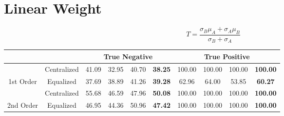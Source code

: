 \documentclass[10pt,a4paper]{article}
\begin{document}
	
	\section{Linear Weight}
		$$T = \frac{\sigma_B \mu_A + \sigma_A \mu_B}{\sigma_B + \sigma_A}$$
		
		\begin{table}[!h]
			\centering
			\begin{tabular}{|c|c|c|c|c|c|c|c|c|c|}
				\hline
				&             & \multicolumn{4}{c|}{True Negative}                            & \multicolumn{4}{c|}{True Positive}                                \\ \hline
				& Centralized & 41.09 & 32.95 & 40.70 & {\color[HTML]{FE0000} \textbf{38.25}} & 100.00 & 100.00 & 100.00 & {\color[HTML]{FE0000} \textbf{100.00}} \\ \cline{2-10} 
				\multirow{-2}{*}{1st Order} & Equalized   & 37.69 & 38.89 & 41.26 & {\color[HTML]{FE0000} \textbf{39.28}} & 62.96  & 64.00  & 53.85  & {\color[HTML]{FE0000} \textbf{60.27}}  \\ \hline
				& Centralized & 55.68 & 46.59 & 47.96 & {\color[HTML]{FE0000} \textbf{50.08}} & 100.00 & 100.00 & 100.00 & {\color[HTML]{FE0000} \textbf{100.00}} \\ \cline{2-10} 
				\multirow{-2}{*}{2nd Order} & Equalized   & 46.95 & 44.36 & 50.96 & {\color[HTML]{FE0000} \textbf{47.42}} & 100.00 & 100.00 & 100.00 & {\color[HTML]{FE0000} \textbf{100.00}} \\ \hline
			\end{tabular}
		\end{table}
		
\end{document}
